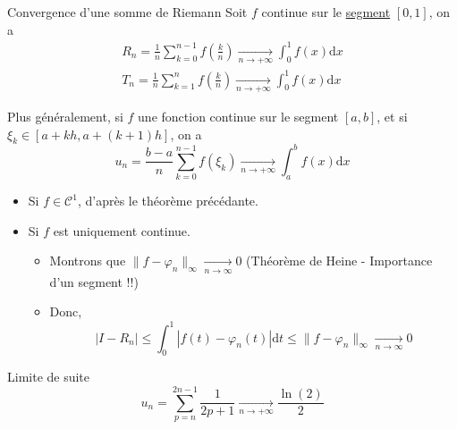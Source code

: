 \begin{Theorem}{\color{red} Convergence d'une somme de Riemann}{}
  Soit $f$ continue sur le \underline{segment} $[0,1]$, on a 
\begin{gather}
  R_n = \frac{1}{n} \sum_{k=0}^{n-1} f \left( \frac{k}{n}  \right)  \underset{n \to + \infty}{\longrightarrow}  \int_{0}^{1} f(x) \mathrm{d} x \\ 
  T_n = \frac{1}{n} \sum_{k=1}^{n} f \left( \frac{k}{n}  \right)  \underset{n \to + \infty}{\longrightarrow}  \int_{0}^{1} f(x) \mathrm{d} x
\end{gather}

Plus généralement, si $f$ une fonction continue sur le segment $[a,b]$, et si $\xi_k \in [a+kh, a+ (k+1)h]$, on a 
\begin{equation}
  u_n = \frac{b-a}{n}  \sum_{
    k=0
  }^{n-1} f(\xi_k)  \underset{n \to + \infty}{\longrightarrow}  \int_{a}^{b} f(x) \mathrm{d}x
\end{equation}
\end{Theorem}

\begin{myproof}{}{}
\begin{itemize}

    \item Si $f \in \mathscr{C} ^{1}$, d'après le théorème précédante. 
    \item Si $f$ est uniquement continue. 
      \begin{itemize}

          \item Montrons que $\| f - \varphi_n \| _{\infty}  \underset{n \to \infty}{\longrightarrow} 0$ (Théorème de Heine - Importance d'un segment !!) 

          \item  Donc, 
            \begin{equation}
              |I - R_n | \le \int_{0}^{1} | f(t)- \varphi_n(t) |\mathrm{d} t  \le \| f - \varphi_n \| _{\infty}  \underset{n \to \infty}{\longrightarrow} 0
            \end{equation}

      \end{itemize}

\end{itemize}
\end{myproof}


\begin{Example}{}{}
Limite de suite 
\begin{equation}
  u_n = \sum_{p=n}^{2n-1} \frac{1}{2p+1}   \underset{n \to + \infty}{\longrightarrow} \frac{\ln(2)}{2} 
\end{equation}
\end{Example}





